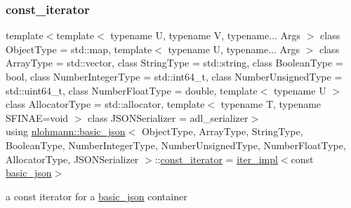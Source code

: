 \subsubsection{\texorpdfstring{const\_iterator}{const\_iterator}}
{\footnotesize\ttfamily template$<$template$<$ typename U, typename V, typename... Args $>$ class Object\+Type = std\+::map, template$<$ typename U, typename... Args $>$ class Array\+Type = std\+::vector, class String\+Type  = std\+::string, class Boolean\+Type  = bool, class Number\+Integer\+Type  = std\+::int64\+\_\+t, class Number\+Unsigned\+Type  = std\+::uint64\+\_\+t, class Number\+Float\+Type  = double, template$<$ typename U $>$ class Allocator\+Type = std\+::allocator, template$<$ typename T, typename S\+F\+I\+N\+A\+E=void $>$ class J\+S\+O\+N\+Serializer = adl\+\_\+serializer$>$ \\
using \mbox{\hyperlink{classnlohmann_1_1basic__json}{nlohmann\+::basic\+\_\+json}}$<$ Object\+Type, Array\+Type, String\+Type, Boolean\+Type, Number\+Integer\+Type, Number\+Unsigned\+Type, Number\+Float\+Type, Allocator\+Type, J\+S\+O\+N\+Serializer $>$\+::\mbox{\hyperlink{classnlohmann_1_1basic__json_a41a70cf9993951836d129bb1c2b3126a}{const\+\_\+iterator}} =  \mbox{\hyperlink{classnlohmann_1_1basic__json_1_1iter__impl}{iter\+\_\+impl}}$<$const \mbox{\hyperlink{classnlohmann_1_1basic__json}{basic\+\_\+json}}$>$}



a const iterator for a \mbox{\hyperlink{classnlohmann_1_1basic__json}{basic\+\_\+json}} container 

\mbox{\label{classnlohmann_1_1basic__json_aff3d5cd2a75612364b888d8693231b58}} 
